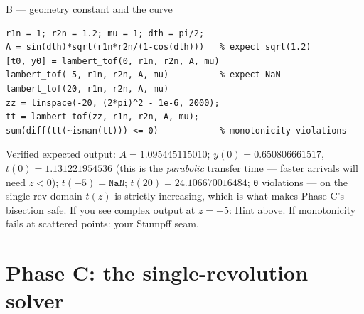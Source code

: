 \documentclass[11pt,letterpaper]{article}
\begin{document}
\begin{checkpoint}{B --- geometry constant and the curve}
\begin{verbatim}
r1n = 1; r2n = 1.2; mu = 1; dth = pi/2;
A = sin(dth)*sqrt(r1n*r2n/(1-cos(dth)))   % expect sqrt(1.2)
[t0, y0] = lambert_tof(0, r1n, r2n, A, mu)
lambert_tof(-5, r1n, r2n, A, mu)          % expect NaN
lambert_tof(20, r1n, r2n, A, mu)
zz = linspace(-20, (2*pi)^2 - 1e-6, 2000);
tt = lambert_tof(zz, r1n, r2n, A, mu);
sum(diff(tt(~isnan(tt))) <= 0)            % monotonicity violations
\end{verbatim}
Verified expected output: $A = 1.095445115010$;
$y(0) = 0.650806661517$, $t(0) = 1.131221954536$ (this is the
\emph{parabolic} transfer time --- faster arrivals will need $z<0$);
$t(-5) = \texttt{NaN}$; $t(20) = 24.106670016484$; \texttt{0} violations
--- on the single-rev domain $t(z)$ is strictly increasing, which is what
makes Phase C's bisection safe. If you see complex output at $z=-5$:
Hint above. If monotonicity fails at scattered points: your Stumpff seam.
\end{checkpoint}

\section{Phase C: the single-revolution solver}
\end{document}
